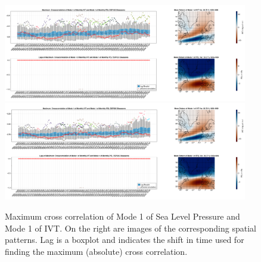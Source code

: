 \begin{figure}
  \begin{center}
    \includegraphics[width=0.95\textwidth]{figures/crosscorrelation_boxplot_ivt_psl_modes11_ssp126_50seasons.png}
    \includegraphics[width=0.95\textwidth]{figures/crosscorrelation_boxplot_ivt_psl_modes11_ssp585_50seasons.png}
  \end{center}
  \caption{Maximum cross correlation of Mode 1 of Sea Level Pressure and Mode 1 of IVT. On the right are images of the corresponding spatial patterns. Lag is a boxplot and indicates the shift in time used for finding the maximum (absolute) cross correlation.}
  \label{fig:crosscor ivt psl modes11}
\end{figure}

